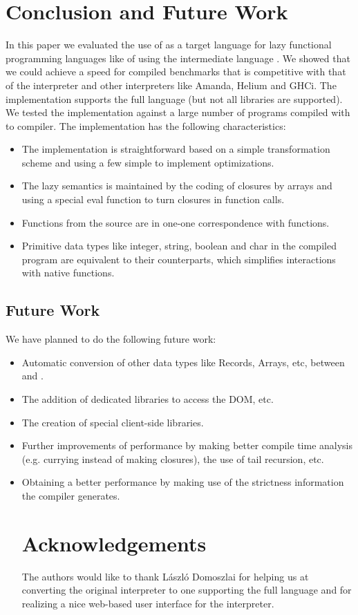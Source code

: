 \section{Conclusion and Future Work}\label{sapljs:sec:conclusions}
In this paper we evaluated the use of \JS as a target language for lazy functional programming languages like \Haskell of \Clean using the intermediate language \Sapl.
We showed that we could achieve a speed for compiled benchmarks 
that is competitive with that of the  \Sapl interpreter and other interpreters like \textsf{Amanda}, 
\textsf{Helium} and \textsf{GHCi}.
The implementation supports the full \Clean language (but not all libraries are supported).
We tested the implementation against a large number of \Clean programs compiled with \Clean to \Sapl compiler. 
The implementation has the following characteristics:
\begin{itemize}
\item The implementation is straightforward based on a simple transformation scheme and using a few simple to implement optimizations.
\item The lazy semantics is maintained by the coding of closures by \JS arrays and using a special \textsf{eval} function to turn closures in function calls.
\item Functions from the source are in one-one correspondence with \JS functions.
\item Primitive data types like integer, string, boolean and char in the compiled program are equivalent to their \JS counterparts, which simplifies interactions with native \JS functions.
\end{itemize}

\subsection{Future Work}
We have planned to do the following future work:
\begin{itemize}
\item Automatic conversion of other data types like Records, Arrays, etc, between \Sapl and \JS.
\item The addition of dedicated libraries to access the DOM, etc.
\item The creation of special client-side \iTask libraries.
\item Further improvements of performance by making better compile time analysis (e.g. \JS currying instead of making closures),
the use of tail recursion, etc.
\item Obtaining a better performance by making use of the strictness information the \Clean compiler generates.

\section*{Acknowledgements}
The authors would like to thank L\'aszl\'o Domoszlai for helping us at converting the original interpreter to one supporting the full \Sapl language and
for realizing a nice web-based user interface for the interpreter.
\end{itemize}